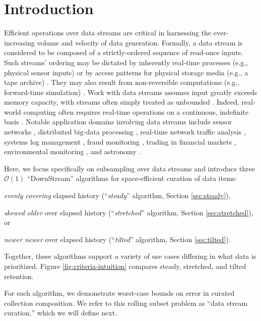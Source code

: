 \section{Introduction} \label{sec:introduction}

Efficient operations over data streams are critical in harnessing the ever-increasing volume and velocity of data generation.
Formally, a data stream is considered to be composed of a strictly-ordered sequence of read-once inputs.
Such streams' ordering may be dictated by inherently real-time processes (e.g., physical sensor inputs) or by access patterns for physical storage media (e.g., a tape archive) \citep{henzinger1998computing}.
They may also result from non-reversible computations (e.g., forward-time simulation) \citep{abdulla2004simulation,schutzel2014stream}.
Work with data streams assumes input greatly exceeds memory capacity, with streams often simply treated as unbounded \citep{jiang2006research}.
Indeed, real-world computing often requires real-time operations on a continuous, indefinite basis \citep{cordeiro2016online}.
Notable application domains involving data streams include sensor networks \citep{elnahrawy2003research}, distributed big-data processing \citep{he2010comet}, real-time network traffic analysis \citep{johnson2005streams,muthukrishnan2005data}, systems log management \citep{fischer2012real}, fraud monitoring \citep{rajeshwari2016real}, trading in financial markets \citep{agarwal2009faster}, environmental monitoring \citep{hill2009real}, and astronomy \citep{graham2012data}.

Here, we focus specifically on subsampling over data streams and introduce three $\mathcal{O}(1)$ ``DownStream'' algorithms for space-efficient curation of data items:
\begin{enumerate*}
\item \textit{evenly covering} elapsed history (``\textit{steady}'' algorithm, Section \ref{sec:steady}),
\item \textit{skewed older} over elapsed history (``\textit{stretched}'' algorithm, Section \ref{sec:stretched}), or
\item \textit{newer newer} over elapsed history (``\textit{tilted}'' algorithm, Section \ref{sec:tilted}).
\end{enumerate*}
Together, these algorithms support a variety of use cases differing in what data is prioritized.
Figure \ref{fig:criteria-intuition} compares steady, stretched, and tilted retention.

For each algorithm, we demonstrate worst-case bounds on error in curated collection composition.
We refer to this rolling subset problem as ``data stream curation,'' which we will define next.






